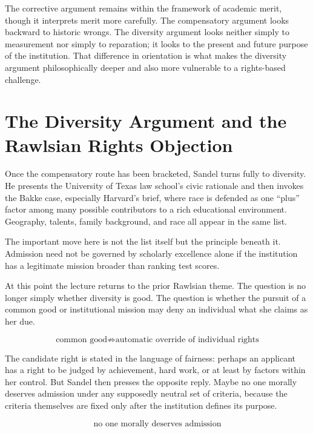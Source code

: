 The corrective argument remains within the framework of academic merit, though it interprets merit more carefully. The compensatory argument looks backward to historic wrongs. The diversity argument looks neither simply to measurement nor simply to reparation; it looks to the present and future purpose of the institution. That difference in orientation is what makes the diversity argument philosophically deeper and also more vulnerable to a rights-based challenge.

\section{The Diversity Argument and the Rawlsian Rights Objection}

Once the compensatory route has been bracketed, Sandel turns fully to diversity. He presents the University of Texas law school's civic rationale and then invokes the Bakke case, especially Harvard's brief, where race is defended as one ``plus'' factor among many possible contributors to a rich educational environment. Geography, talents, family background, and race all appear in the same list.

The important move here is not the list itself but the principle beneath it. Admission need not be governed by scholarly excellence alone if the institution has a legitimate mission broader than ranking test scores.

At this point the lecture returns to the prior Rawlsian theme. The question is no longer simply whether diversity is good. The question is whether the pursuit of a common good or institutional mission may deny an individual what she claims as her due.

\begin{equation}
\text{common good} \not\Longrightarrow \text{automatic override of individual rights}
\end{equation}

The candidate right is stated in the language of fairness: perhaps an applicant has a right to be judged by achievement, hard work, or at least by factors within her control. But Sandel then presses the opposite reply. Maybe no one morally deserves admission under any supposedly neutral set of criteria, because the criteria themselves are fixed only after the institution defines its purpose.

\begin{equation}
\text{no one morally deserves admission}
\end{equation}

